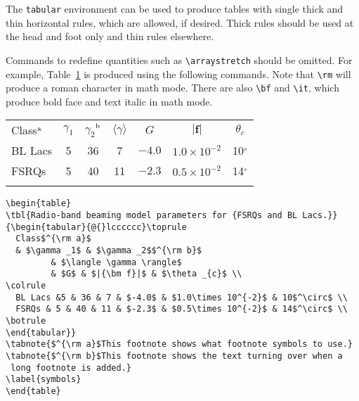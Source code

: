 \documentclass{tADR2e}
\begin{document}
The {\tt tabular} environment can be used to produce tables with single thick and thin horizontal rules, which
are allowed, if desired. Thick rules should be used at the head and foot only and thin rules elsewhere.

Commands to redefine quantities such as \verb"\arraystretch" should be omitted. For example, Table~\ref{symbols}
is produced using the following commands. Note that \verb"\rm" will produce a roman character in math mode. There
are also \verb"\bf" and \verb"\it", which produce bold face and text italic in math mode.

\begin{table}
{\begin{tabular}[l]{@{}lcccccc}\toprule
  Class$^{\rm a}$
  & $\gamma _1$ & $\gamma _2$$^{\rm b}$
         & $\langle \gamma \rangle$
         & $G$ & $|{\bm f}|$ & $\theta _{c}$ \\
\colrule
  BL Lacs &5 & 36 & 7 & $-4.0$ & $1.0\times 10^{-2}$ & 10$^\circ$ \\
  FSRQs & 5 & 40 & 11 & $-2.3$ & $0.5\times 10^{-2}$ & 14$^\circ$ \\
\botrule
\end{tabular}}
\label{symbols}
\end{table}


\begin{verbatim}
\begin{table}
\tbl{Radio-band beaming model parameters for {FSRQs and BL Lacs.}}
{\begin{tabular}{@{}lcccccc}\toprule
  Class$^{\rm a}$
  & $\gamma _1$ & $\gamma _2$$^{\rm b}$
         & $\langle \gamma \rangle$
         & $G$ & $|{\bm f}|$ & $\theta _{c}$ \\
\colrule
  BL Lacs &5 & 36 & 7 & $-4.0$ & $1.0\times 10^{-2}$ & 10$^\circ$ \\
  FSRQs & 5 & 40 & 11 & $-2.3$ & $0.5\times 10^{-2}$ & 14$^\circ$ \\
\botrule
\end{tabular}}
\tabnote{$^{\rm a}$This footnote shows what footnote symbols to use.}
\tabnote{$^{\rm b}$This footnote shows the text turning over when a 
 long footnote is added.}
\label{symbols}
\end{table}
\end{verbatim}
\end{document}
